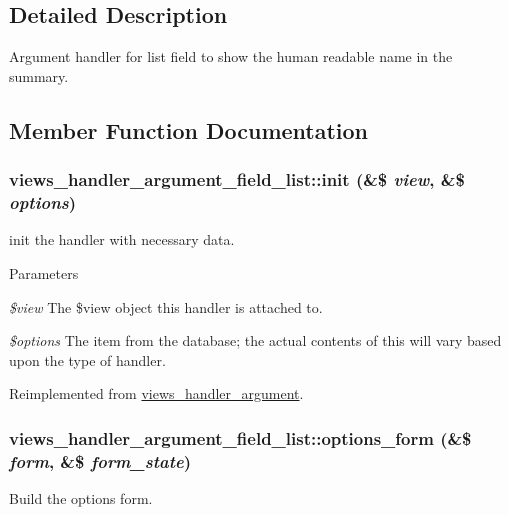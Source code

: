 \subsection{Detailed Description}
Argument handler for list field to show the human readable name in the summary. 

\subsection{Member Function Documentation}
\hypertarget{classviews__handler__argument__field__list_ad0fd51038ca7c41ddd7f63715cb3c733}{
\subsubsection[{init}]{\setlength{\rightskip}{0pt plus 5cm}views\_\-handler\_\-argument\_\-field\_\-list::init (\&\$ {\em view}, \/  \&\$ {\em options})}}
\label{classviews__handler__argument__field__list_ad0fd51038ca7c41ddd7f63715cb3c733}
init the handler with necessary data. 
\begin{DoxyParams}{Parameters}
\item[{\em \$view}]The \$view object this handler is attached to. \item[{\em \$options}]The item from the database; the actual contents of this will vary based upon the type of handler. \end{DoxyParams}


Reimplemented from \hyperlink{classviews__handler__argument_a2c7e59a9df090d59d9d7d2827b6da85a}{views\_\-handler\_\-argument}.\hypertarget{classviews__handler__argument__field__list_a8fd9b838e00ade74124ff96dbfce439c}{
\subsubsection[{options\_\-form}]{\setlength{\rightskip}{0pt plus 5cm}views\_\-handler\_\-argument\_\-field\_\-list::options\_\-form (\&\$ {\em form}, \/  \&\$ {\em form\_\-state})}}
\label{classviews__handler__argument__field__list_a8fd9b838e00ade74124ff96dbfce439c}
Build the options form. 

